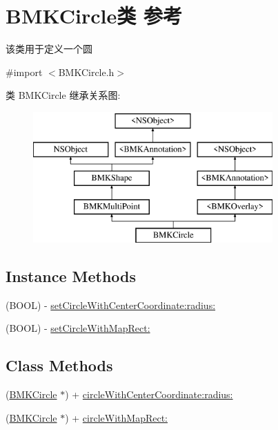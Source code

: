\hypertarget{interface_b_m_k_circle}{}\section{B\+M\+K\+Circle类 参考}
\label{interface_b_m_k_circle}


该类用于定义一个圆  




{\ttfamily \#import $<$B\+M\+K\+Circle.\+h$>$}

类 B\+M\+K\+Circle 继承关系图\+:\begin{figure}[H]
\begin{center}
\leavevmode
\includegraphics[height=5.000000cm]{interface_b_m_k_circle}
\end{center}
\end{figure}
\subsection*{Instance Methods}
\begin{DoxyCompactItemize}
\item 
(B\+O\+O\+L) -\/ \hyperlink{interface_b_m_k_circle_a391e20e4faf6acfcc756241a428a3bda}{set\+Circle\+With\+Center\+Coordinate\+:radius\+:}
\item 
(B\+O\+O\+L) -\/ \hyperlink{interface_b_m_k_circle_af7e1989427e64eef9e6fd43459c867ea}{set\+Circle\+With\+Map\+Rect\+:}
\end{DoxyCompactItemize}
\subsection*{Class Methods}
\begin{DoxyCompactItemize}
\item 
(\hyperlink{interface_b_m_k_circle}{B\+M\+K\+Circle} $\ast$) + \hyperlink{interface_b_m_k_circle_a82a7234e92fda719b74d6055ee30d360}{circle\+With\+Center\+Coordinate\+:radius\+:}
\item 
(\hyperlink{interface_b_m_k_circle}{B\+M\+K\+Circle} $\ast$) + \hyperlink{interface_b_m_k_circle_af4109f36f784b80a758a0b48c636e4a7}{circle\+With\+Map\+Rect\+:}
\end{DoxyCompactItemize}
